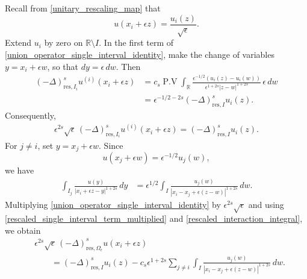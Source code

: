 \documentclass[preprint,12pt]{elsarticle}
\newcommand{\R}{\mathbb R}
\newcommand{\pv}{\operatorname{P.V}}
\begin{document}
Recall from \eqref{unitary_rescaling_map} that
\[
    u(x_i+\epsilon z)
    =
    \frac{u_i(z)}{\sqrt{\epsilon}}.
\]
Extend $u_i$ by zero on $\R\setminus I$. In the first term of
\eqref{union_operator_single_interval_identity}, make the change of
variables $y=x_i+\epsilon w$, so that $dy=\epsilon\,dw$. Then
\begin{align}
(-\Delta)^s_{\mathrm{res},I_i}u^{(i)}(x_i+\epsilon z)
&=
c_s\pv\int_{\R}
\frac{\epsilon^{-1/2}(u_i(z)-u_i(w))}
{\epsilon^{1+2s}|z-w|^{1+2s}}\,
\epsilon\,dw\nonumber\\
&=
\epsilon^{-1/2-2s}
(-\Delta)^s_{\mathrm{res},I}u_i(z).
\label{rescaled_single_interval_term}
\end{align}
Consequently,
\begin{align}
\epsilon^{2s}\sqrt{\epsilon}\,
(-\Delta)^s_{\mathrm{res},I_i}
u^{(i)}(x_i+\epsilon z)
=
(-\Delta)^s_{\mathrm{res},I}u_i(z).
\label{rescaled_single_interval_term_multiplied}
\end{align}
For $j\neq i$, set $y=x_j+\epsilon w$. Since
\[
    u(x_j+\epsilon w)
    =
    \epsilon^{-1/2}u_j(w),
\]
we have
\begin{align}
\int_{I_j}
\frac{u(y)}
{|x_i+\epsilon z-y|^{1+2s}}\,dy
&=
\epsilon^{1/2}
\int_I
\frac{u_j(w)}
{|x_i-x_j+\epsilon(z-w)|^{1+2s}}\,dw.
\label{rescaled_interaction_integral}
\end{align}
Multiplying \eqref{union_operator_single_interval_identity} by
$\epsilon^{2s}\sqrt{\epsilon}$ and using
\eqref{rescaled_single_interval_term_multiplied} and
\eqref{rescaled_interaction_integral}, we obtain
\begin{align}\label{correct_rescaled_frac_lap}
&\epsilon^{2s}\sqrt{\epsilon}\,
(-\Delta)^s_{\mathrm{res},\Omega_\epsilon}
u(x_i+\epsilon z)\nonumber\\
&\qquad=
(-\Delta)^s_{\mathrm{res},I}u_i(z)
-
c_s\epsilon^{1+2s}
\sum_{j\neq i}
\int_I
\frac{u_j(w)}
{|x_i-x_j+\epsilon(z-w)|^{1+2s}}\,dw.
\end{align}
\end{document}
